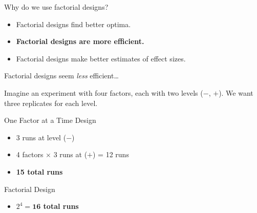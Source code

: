 \documentclass[10pt]{beamer}
\begin{document}
\begin{frame}{Why do we use factorial designs?}

\begin{itemize}
\item
  Factorial designs find better optima.
\item
  \textbf{Factorial designs are more efficient.}
\item
  Factorial designs make better estimates of effect sizes.
\end{itemize}

\end{frame}

\begin{frame}{Factorial designs seem \emph{less} efficient\ldots{}}

Imagine an experiment with four factors, each with two levels (\(-\),
\(+\)). We want three replicates for each level.

\medskip

One Factor at a Time Design

\begin{itemize}
\item
  3 runs at level (\(-\))
\item
  4 factors \(\times\) 3 runs at (\(+\)) = 12 runs
\item
  \textbf{15 total runs}
\end{itemize}

Factorial Design

\begin{itemize}
\item
  \textbf{$2^4 = \textbf{16}$ total runs}
\end{itemize}

\end{frame}
\end{document}
